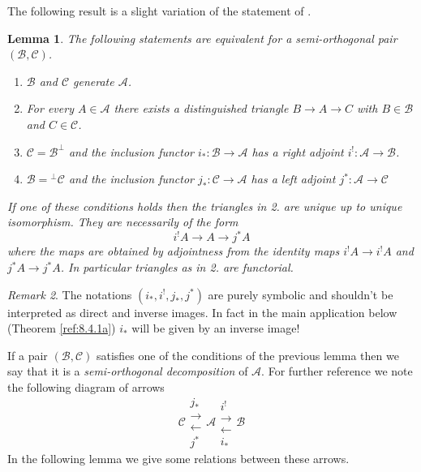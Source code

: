 \documentclass{amsproc}
\def\Ascr{{\mathcal A}}
\def\Bscr{{\mathcal B}}
\def\Cscr{{\mathcal C}}
\def\r{\rightarrow}
\newtheorem{lemmas}{Lemma}[subsection]
\theoremstyle{definition}
\theoremstyle{remark}
\newtheorem{remarks}[lemmas]{Remark}
\numberwithin{equation}{section}
\numberwithin{table}{section}
\numberwithin{figure}{section}
\begin{document}
The following result is a slight variation of the statement of
\cite[Lemma 3.1]{Bondal2}.
\begin{lemmas}
\label{ref:8.1.1a}
 The following statements are equivalent for a
  semi-orthogonal pair $(\Bscr,\Cscr)$.
\begin{enumerate}
\item
$\Bscr$ and $\Cscr$ generate $\Ascr$.
\item For every $A\in\Ascr$ there exists a distinguished triangle $B\r
  A\r C$ with $B\in\Bscr$ and $C\in\Cscr$.
\item $\Cscr=\Bscr^\perp$ and  the inclusion functor
  $i_\ast:\Bscr\r\Ascr$ has a right adjoint $i^!:\Ascr\r \Bscr$.
\item $\Bscr={}^\perp\Cscr$ and  the inclusion functor $j_\ast:\Cscr\r
  \Ascr$ has a left adjoint  $j^\ast:\Ascr\r \Cscr$
\end{enumerate}
If one of these conditions holds then the triangles in 2. are unique
up to unique isomorphism. They are necessarily of the form 
\[
i^! A\r A \r j^\ast A
\]
where the maps are obtained by adjointness from the identity maps
$i^!A\r i^! A$ and $j^\ast A \r j^\ast A$. In particular triangles as
in 2. are functorial.
\end{lemmas}
\begin{remarks} The notations $(i_*,i^!, j_*, j^*)$ are purely symbolic
  and shouldn't be interpreted as direct and inverse images. In fact
  in the main application  below (Theorem \ref{ref:8.4.1a}) $i_*$ will be
  given by an inverse image!
\end{remarks}
If a pair $(\Bscr,\Cscr)$ satisfies one of the conditions of the
previous lemma then we say that it is a \emph{semi-orthogonal
decomposition} of $\Ascr$.
For further reference we note the following diagram of arrows
\begin{equation}
\label{ref:8.1b}
\Cscr \begin{array}{c} j_\ast\\ \rightarrow\\ \leftarrow
  \\ j^\ast\end{array}
 \Ascr 
\begin{array}{c}\displaystyle  i^!\\ \rightarrow\\ 
  \leftarrow \\i_\ast
\end{array}
 \Bscr
\end{equation}
In the following lemma we give some relations between these arrows.
\end{document}
